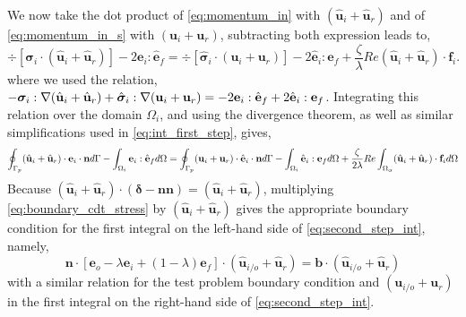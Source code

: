 We now take the dot product of \ref{eq:momentum_in} with $(\hat{\textbf{u}}_i + \hat{\textbf{u}}_r)$ and of \ref{eq:momentum_in_s} with $(\textbf{u}_i+ \textbf{u}_r)$, subtracting both expression leads to, 
\begin{equation}
    \div [\bm\sigma_{i}\cdot (\hat{\textbf{u}}_i+\hat{\textbf{u}}_r)]
    - 2\textbf{e}_i : \hat{\textbf{e}}_f
    =
    \div [\hat{\bm\sigma}_{i}\cdot (\textbf{u}_i+\textbf{u}_r)]
    - 2\hat{\textbf{e}}_i :\textbf{e}_f
    + \frac{\zeta}{\lambda} Re (\hat{\textbf{u}}_i+\hat{\textbf{u}}_r)\cdot \textbf{f}_{i}. 
    \label{eq:second_step_out}
\end{equation}
where we used the relation, $- \bm\sigma_i :\mathbf{\nabla} (\hat{\textbf{u}}_i+\hat{\textbf{u}}_r)+ \hat{\bm\sigma}_i :\mathbf{\nabla} ({\textbf{u}}_i+{\textbf{u}}_r) =
- 2\textbf{e}_i :\hat{\textbf{e}}_f + 2\hat{\textbf{e}}_i :\textbf{e}_f$. 
Integrating this relation over the domain $\Omega_i$, and using the divergence theorem, as well as similar simplifications used in \ref{eq:int_first_step}, gives, 
\begin{equation}
    \intS[p]{ (\hat{\textbf{u}}_i+\hat{\textbf{u}}_r)\cdot \textbf{e}_{i}\cdot\textbf{n}}
    - \intO[i]{\textbf{e}_i : \hat{\textbf{e}}_f}
    =
    \intS[p]{ (\textbf{u}_i+\textbf{u}_r)\cdot\hat{\textbf{e}}_{i}\cdot \textbf{n}}
    - \intO[i]{\hat{\textbf{e}}_i :\textbf{e}_f}
    + \frac{\zeta}{2\lambda} Re \intO{(\hat{\textbf{u}}_i+\hat{\textbf{u}}_r)\cdot \textbf{f}_{i}} 
    \label{eq:second_step_int}
\end{equation}
Because $(\hat{\textbf{u}}_i+\hat{\textbf{u}}_r)\cdot (\bm\delta-\textbf{nn}) = (\hat{\textbf{u}}_i+\hat{\textbf{u}}_r)$, multiplying \ref{eq:boundary_cdt_stress} by $(\hat{\textbf{u}}_i+\hat{\textbf{u}}_r)$ gives the appropriate boundary condition for the first integral on the left-hand side of \ref{eq:second_step_int}, namely,
\begin{equation}
    \mathbf{n}\cdot [
        \textbf{e}_{o} - \lambda \textbf{e}_i 
        + (1 -\lambda) \textbf{e}_f
        ]\cdot (\hat{\textbf{u}}_{i/o}+\hat{\textbf{u}}_r)
        =
        \textbf{b}\cdot (\hat{\textbf{u}}_{i/o}+\hat{\textbf{u}}_r)
    \label{eq:boundary_with_the_velocity}
\end{equation}
with a similar relation for the test problem boundary condition and $({\textbf{u}}_{i/o}+{\textbf{u}}_r)$ in the first integral on the right-hand side of \ref{eq:second_step_int}. 


